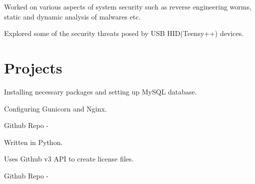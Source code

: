 \documentclass[]{deedy-resume-openfont}
\begin{document}
\begin{minipage}[t]{0.66\textwidth}
\begin{tightemize}
\item Worked on various aspects of system security such as reverse engineering worms, static and dynamic analysis of malwares etc.
\item Explored some of the security threats posed by USB HID(Teensy++) devices.
\end{tightemize}
\sectionsep


\section{Projects}

\begin{tightemize}
\item Installing necessary packages and setting up MySQL database.
\item Configuring Gunicorn and Nginx.
\end{tightemize}
Github Repo - \href{https://www.github.com/pattu777/Ansible-Django}{}
\sectionsep


\begin{tightemize}
\item Written in Python.
\item Uses Github v3 API to create license files.
\end{tightemize}
Github Repo - \href{https://www.github.com/pattu777/Lucy/}{}
\sectionsep

\end{minipage} 
\end{document}
